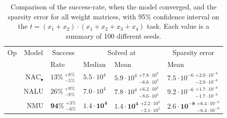 \begin{table}[!h]

\caption{\label{tab:very-simple-function-results}Comparison of the success-rate, when the model converged, and the sparsity error for all weight matrices, with 95\% confidence interval on the $t = (x_1 + x_2) \cdot (x_1 + x_2 + x_3 + x_4)$ task. Each value is a summary of 100 different seeds.}
\centering
\begin{tabular}{crllll}
\toprule
\multicolumn{1}{c}{Op} & \multicolumn{1}{c}{Model} & \multicolumn{1}{c}{Success} & \multicolumn{2}{c}{Solved at} & \multicolumn{1}{c}{Sparsity error} \\
\cmidrule(l{3pt}r{3pt}){1-1} \cmidrule(l{3pt}r{3pt}){2-2} \cmidrule(l{3pt}r{3pt}){3-3} \cmidrule(l{3pt}r{3pt}){4-5} \cmidrule(l{3pt}r{3pt}){6-6}
 &  & Rate & Median & Mean & Mean\\
\midrule
 & $\mathrm{NAC}_{\bullet}$ & $13\% {~}^{+8\%}_{-5\%}$ & $5.5 \cdot 10^{4}$ & $5.9 \cdot 10^{4} {~}^{+7.8 \cdot 10^{3}}_{-6.6 \cdot 10^{3}}$ & $7.5 \cdot 10^{-6} {~}^{+2.0 \cdot 10^{-6}}_{-2.0 \cdot 10^{-6}}$\\

\nopagebreak
 & NALU & $26\% {~}^{+9\%}_{-8\%}$ & $7.0 \cdot 10^{4}$ & $7.8 \cdot 10^{4} {~}^{+6.2 \cdot 10^{3}}_{-8.6 \cdot 10^{3}}$ & $9.2 \cdot 10^{-6} {~}^{+1.7 \cdot 10^{-6}}_{-1.7 \cdot 10^{-6}}$\\

\nopagebreak
\multirow{-3}{*}{\centering\arraybackslash $\bm{\times}$} & NMU & $\mathbf{94\%} {~}^{+3\%}_{-6\%}$ & $\mathbf{1.4 \cdot 10^{4}}$ & $\mathbf{1.4 \cdot 10^{4}} {~}^{+2.2 \cdot 10^{2}}_{-2.1 \cdot 10^{2}}$ & $\mathbf{2.6 \cdot 10^{-8}} {~}^{+6.4 \cdot 10^{-9}}_{-6.4 \cdot 10^{-9}}$\\
\bottomrule
\end{tabular}
\end{table}

